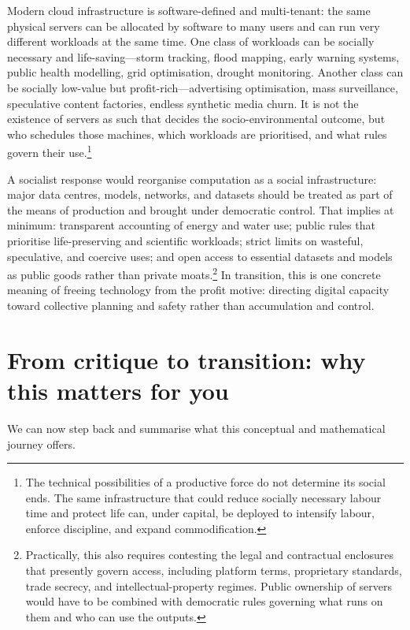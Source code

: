Modern cloud infrastructure is software-defined and multi-tenant: the same physical servers can be allocated by software to many users and can run very different workloads at the same time. One class of workloads can be socially
necessary and life-saving---storm tracking, flood mapping, early warning systems, public health modelling,
grid optimisation, drought monitoring. Another class can be socially low-value but profit-rich---advertising
optimisation, mass surveillance, speculative content factories, endless synthetic media churn.
It is not the existence of servers as such that decides the socio-environmental outcome, but who schedules those machines, which workloads are prioritised,
and what rules govern their use.\footnote{The technical possibilities of a productive force do not determine its social ends. The same infrastructure that could reduce socially necessary labour time and protect life can, under capital, be deployed to intensify labour, enforce discipline, and expand commodification.}

A socialist response would reorganise computation as a social infrastructure:
major data centres, models, networks, and datasets should be treated as part of
the means of production and brought under democratic control.
That implies at minimum: transparent accounting of energy and water use; public rules that prioritise
life-preserving and scientific workloads; strict limits on wasteful, speculative, and coercive uses;
and open access to essential datasets and models as public goods rather than private moats.\footnote{Practically, this also requires contesting the legal and contractual
enclosures that presently govern access, including platform terms, proprietary
standards, trade secrecy, and intellectual-property regimes. Public ownership of
servers would have to be combined with democratic rules governing what runs on
them and who can use the outputs.}
In transition, this is one concrete meaning of freeing technology from the profit motive: directing
digital capacity toward collective planning and safety rather than accumulation and control.

\section{From critique to transition: why this matters for you}
\label{sec:transition}

We can now step back and summarise what this conceptual and mathematical
journey offers.

